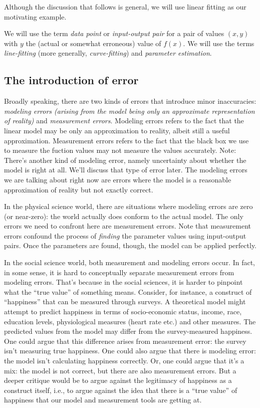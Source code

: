 \documentclass[10pt]{amsart}
\begin{document}
Although the discussion that follows is general, we will use linear
fitting as our motivating example.

We will use the term {\em data point} or {\em input-output pair} for a
pair of values $(x,y)$ with $y$ the (actual or somewhat erroneous)
value of $f(x)$. We will use the terms {\em line-fitting} (more
generally, {\em curve-fitting}) and {\em parameter estimation}.

\subsection{The introduction of error}

Broadly speaking, there are two kinds of errors that introduce minor
inaccuracies: {\em modeling errors (arising from the model being only
  an approximate representation of reality)} and {\em measurement
  errors}. Modeling errors refers to the fact that the linear model
may be only an approximation to reality, albeit still a useful
approximation. Measurement errors refers to the fact that the black
box we use to measure the fuction values may not measure the values
accurately. Note: There's another kind of modeling error, namely
uncertainty about whether the model is right at all. We'll discuss
that type of error later. The modeling errors we are talking about
right now are errors where the model is a reasonable approximation of
reality but not exactly correct.

In the physical science world, there are situations where modeling
errors are zero (or near-zero): the world actually does conform to the
actual model. The only errors we need to confront here are measurement
errors. Note that measurement errors confound the process of {\em
  finding} the parameter values using input-output pairs. Once the
parameters are found, though, the model can be applied perfectly.

In the social science world, both measurement and modeling errors
occur. In fact, in some sense, it is hard to conceptually separate
measurement errors from modeling errors. That's because in the social
sciences, it is harder to pinpoint what the ``true value'' of
something means. Consider, for instance, a construct of ``happiness''
that can be measured through surveys. A theoretical model might
attempt to predict happiness in terms of socio-economic status,
income, race, education levels, physiological measures (heart rate
etc.) and other measures. The predicted values from the model may
differ from the survey-measured happiness. One could argue that this
difference arises from measurement error: the survey isn't measuring
true happiness. One could also argue that there is modeling error: the
model isn't calculating happiness correctly. Or, one could argue that
it's a mix: the model is not correct, but there are also measurement
errors. But a deeper critique would be to argue against the legitimacy
of happiness as a construct itself, i.e., to argue against the idea
that there is a ``true value'' of happiness that our model and
measurement tools are getting at.
\end{document}
